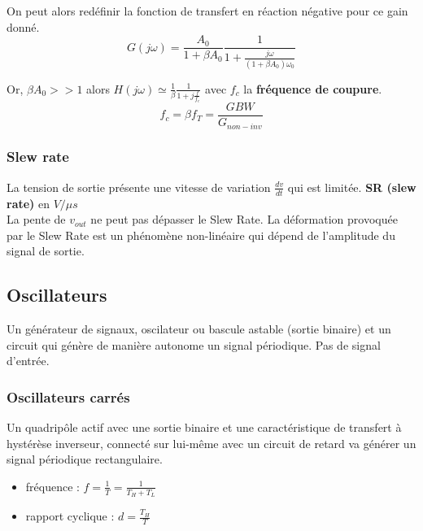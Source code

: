 \documentclass[../main.tex]{subfiles}
\begin{document}
On peut alors redéfinir la fonction de transfert en réaction négative pour ce gain donné. \\
\begin{equation}
    G(j\omega) = \frac{A_0}{1+\beta A_0} \frac{1}{1+ \frac{j\omega}{(1+\beta A_0)\omega_0}}
\end{equation}


Or, $\beta A_0>>1$ alors $H(j\omega) \simeq \frac{1}{\beta} \frac{1}{1+j\frac{f}{f_c}}$ avec $f_c$ la \textbf{fréquence de coupure}. \begin{equation}
    f_c = \beta f_T = \frac{GBW}{G_{non-inv}}
\end{equation}

\subsubsection{Slew rate}
La tension de sortie présente une vitesse de variation $\frac{dv}{dt}$ qui est limitée. \textbf{SR (slew rate)} en $V/\mu s$\\
La pente de $v_{out}$ ne peut pas dépasser le Slew Rate. La déformation provoquée par le Slew Rate est un phénomène non-linéaire qui dépend de l'amplitude du signal de sortie.\\

\subsection{Oscillateurs}
Un générateur de signaux, oscilateur ou bascule astable (sortie binaire) et un circuit qui génère de manière autonome un signal périodique. Pas de signal d'entrée.\\

\subsubsection{Oscillateurs carrés}
Un quadripôle actif avec une sortie binaire et une caractéristique de transfert à hystérèse inverseur, connecté sur lui-même avec un circuit de retard va générer un signal périodique rectangulaire. \\

\begin{itemize}
    \item fréquence : $f = \frac{1}{T} = \frac{1}{T_H+T_L}$\\
    \item rapport cyclique : $d = \frac{T_H}{T}$\\
\end{itemize}
\end{document}
